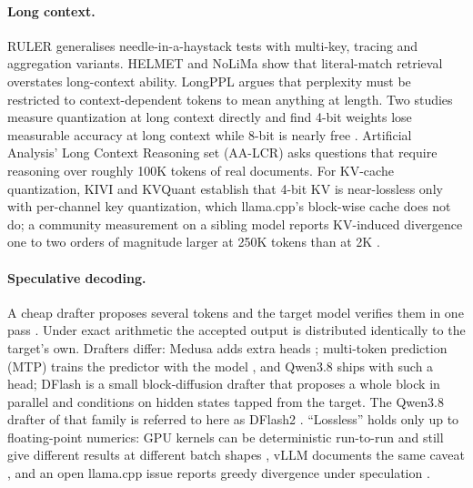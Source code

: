 \paragraph{Long context.} RULER \citep{hsieh2024ruler,ruler_repo} generalises needle-in-a-haystack
tests with multi-key, tracing and aggregation variants. HELMET \citep{yen2025helmet} and NoLiMa
\citep{modarressi2025nolima} show that literal-match retrieval overstates long-context ability.
LongPPL \citep{fang2025longppl} argues that perplexity must be restricted to context-dependent tokens
to mean anything at length. Two studies measure quantization at long context directly and find 4-bit
weights lose measurable accuracy at long context while 8-bit is nearly free
\citep{mekala2025quantlongcontext,redhat_longcontext_quant}. Artificial Analysis' Long Context
Reasoning set (AA-LCR) \citep{artificialanalysis2026aalcr} asks questions that require reasoning over
roughly 100K tokens of real documents. For KV-cache quantization, KIVI \citep{liu2024kivi} and KVQuant
\citep{hooper2024kvquant} establish that 4-bit KV is near-lossless only with per-channel key
quantization, which llama.cpp's block-wise  cache does not do; a community measurement on
a sibling model reports KV-induced divergence one to two orders of magnitude larger at 250K tokens
than at 2K \citep{localbench2026kvquant}.

\paragraph{Speculative decoding.} A cheap drafter proposes several tokens and the target model
verifies them in one pass \citep{leviathan2023speculative,chen2023speculativesampling}. Under exact
arithmetic the accepted output is distributed identically to the target's own. Drafters differ:
Medusa adds extra heads \citep{cai2024medusa}; multi-token prediction (MTP) trains the predictor with
the model \citep{gloeckle2024multitoken,deepseekv3}, and Qwen3.8 ships with such a head; DFlash
\citep{chen2026dflash} is a small block-diffusion drafter that proposes a whole block in parallel and
conditions on hidden states tapped from the target. The Qwen3.8 drafter of that family is referred to
here as DFlash2 \citep{incoai2026dflash2,llamacpp_pr27342_dflash2}. ``Lossless'' holds only up to
floating-point numerics: GPU kernels can be deterministic run-to-run and still give different results
at different batch shapes \citep{thinkingmachines2025nondeterminism}, vLLM documents the same caveat
\citep{vllm_specdecode_docs}, and an open llama.cpp issue reports greedy divergence under
speculation \citep{llamacpp_issue25618}.

